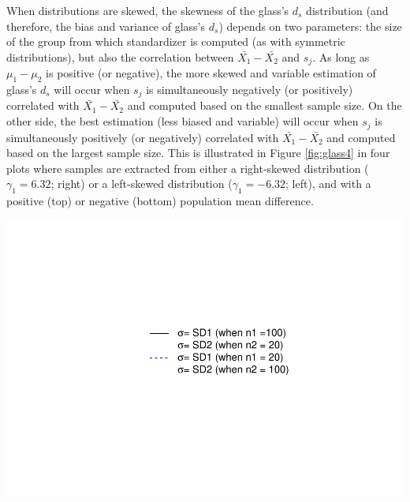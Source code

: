 \documentclass[
  man,floatsintext]{apa6}
\begin{document}
When distributions are skewed, the skewness of the glass's \(d_s\) distribution (and therefore, the bias and variance of glass's \(d_s\)) depends on two parameters: the size of the group from which standardizer is computed (as with symmetric distributions), but also the correlation between \(\bar{X_1}-\bar{X_2}\) and \(s_j\). As long as \(\mu_1-\mu_2\) is positive (or negative), the more skewed and variable estimation of glass's \(d_s\) will occur when \(s_j\) is simultaneously negatively (or positively) correlated with \(\bar{X_1}-\bar{X_2}\) and computed based on the smallest sample size. On the other side, the best estimation (less biased and variable) will occur when \(s_j\) is simultaneously positively (or negatively) correlated with \(\bar{X_1}-\bar{X_2}\) and computed based on the largest sample size. This is illustrated in Figure \ref{fig:glass4} in four plots where samples are extracted from either a right-skewed distribution (\(\gamma_1=6.32\); right) or a left-skewed distribution (\(\gamma_1=-6.32\); left), and with a positive (top) or negative (bottom) population mean difference.

\includegraphics{Mathematical-study-of-Glass-s-d_files/figure-latex/legend-1.pdf}
\end{document}
